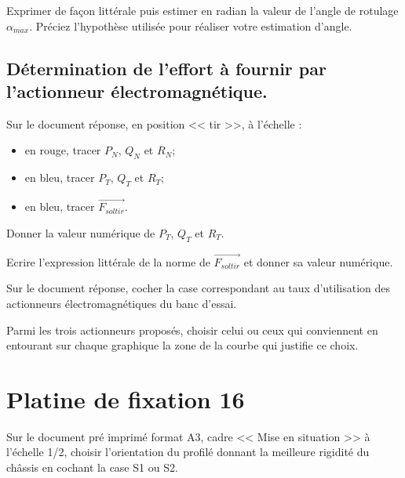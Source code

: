 \documentclass[11pt]{article}
\begin{document}
\UPSTIquestion Exprimer de façon littérale puis estimer en radian la valeur de l'angle de rotulage $\alpha_{max}$.
Préciez l'hypothèse utilisée pour réaliser votre estimation d'angle. 
\begin{UPSTIcorrige}
\end{UPSTIcorrige}

\subsection*{Détermination de l'effort à fournir par l'actionneur électromagnétique.}
\UPSTIquestion* Sur le document réponse, en position << tir >>, à l'échelle : 
\begin{itemize}
\item en rouge, tracer $P_N$, $Q_N$ et $R_N$;
\item en bleu, tracer $P_T$, $Q_T$ et $R_T$;
\item en bleu, tracer $\overrightarrow{F_{sol tir}}$.
\end{itemize}
Donner la valeur numérique de $P_T$, $Q_T$ et $R_T$.
\begin{UPSTIcorrige}
\end{UPSTIcorrige}

\UPSTIquestion Ecrire l'expression littérale de la norme de $\overrightarrow{F_{sol tir}}$ et donner sa valeur numérique.
\begin{UPSTIcorrige}
\end{UPSTIcorrige}

\UPSTIquestion Sur le document réponse, cocher la case correspondant au taux d'utilisation des actionneurs électromagnétiques du banc d'essai.
\begin{UPSTIcorrige}
\end{UPSTIcorrige}

\UPSTIquestion Parmi les trois actionneurs proposés, choisir celui ou ceux qui conviennent en entourant sur chaque graphique la zone de la courbe qui justifie ce choix.
\begin{UPSTIcorrige}
\end{UPSTIcorrige}



\section{Platine de fixation 16}

\UPSTIquestion* Sur le document pré imprimé format A3, cadre << Mise en situation >> à l'échelle 1/2, choisir l'orientation du profilé donnant la meilleure rigidité du châssis en cochant la case S1 ou S2. 
\begin{UPSTIcorrige}
\end{UPSTIcorrige}
\end{document}
